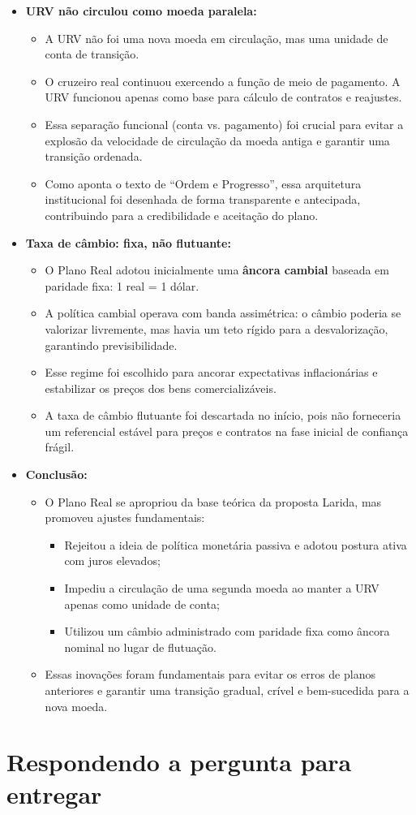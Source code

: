 \documentclass[a4paper,12pt]{article}[abntex2]
\begin{document}
\begin{itemize}
    \item \textbf{URV não circulou como moeda paralela:}
    \begin{itemize}
        \item A URV não foi uma nova moeda em circulação, mas uma unidade de conta de transição.
        \item O cruzeiro real continuou exercendo a função de meio de pagamento. A URV funcionou apenas como base para cálculo de contratos e reajustes.
        \item Essa separação funcional (conta vs. pagamento) foi crucial para evitar a explosão da velocidade de circulação da moeda antiga e garantir uma transição ordenada.
        \item Como aponta o texto de “Ordem e Progresso”, essa arquitetura institucional foi desenhada de forma transparente e antecipada, contribuindo para a credibilidade e aceitação do plano.
    \end{itemize}

    \item \textbf{Taxa de câmbio: fixa, não flutuante:}
    \begin{itemize}
        \item O Plano Real adotou inicialmente uma \textbf{âncora cambial} baseada em paridade fixa: 1 real = 1 dólar.
        \item A política cambial operava com banda assimétrica: o câmbio poderia se valorizar livremente, mas havia um teto rígido para a desvalorização, garantindo previsibilidade.
        \item Esse regime foi escolhido para ancorar expectativas inflacionárias e estabilizar os preços dos bens comercializáveis.
        \item A taxa de câmbio flutuante foi descartada no início, pois não forneceria um referencial estável para preços e contratos na fase inicial de confiança frágil.
    \end{itemize}

    \item \textbf{Conclusão:}
    \begin{itemize}
        \item O Plano Real se apropriou da base teórica da proposta Larida, mas promoveu ajustes fundamentais:
        \begin{itemize}
            \item Rejeitou a ideia de política monetária passiva e adotou postura ativa com juros elevados;
            \item Impediu a circulação de uma segunda moeda ao manter a URV apenas como unidade de conta;
            \item Utilizou um câmbio administrado com paridade fixa como âncora nominal no lugar de flutuação.
        \end{itemize}
        \item Essas inovações foram fundamentais para evitar os erros de planos anteriores e garantir uma transição gradual, crível e bem-sucedida para a nova moeda.
    \end{itemize}

\end{itemize}

\newpage
\section{\textbf{Respondendo a pergunta para entregar}}
\end{document}
